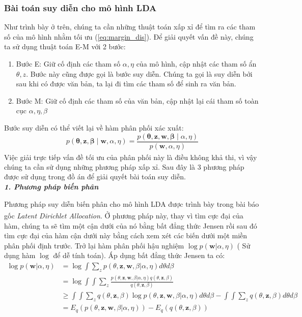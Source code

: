 \documentclass[fontsize=13pt]{scrartcl}
\begin{document}
\subsubsection{Bài toán suy diễn cho mô hình LDA}\label{sub:infermethods}
Như trình bày ở trên, chúng ta cần những thuật toán xấp xỉ để tìm ra các tham số của mô hình nhằm tối ưu (\ref{eq:margin_dis}). Để giải quyết vấn đề này, chúng ta sử dụng thuật toán E-M với 2 bước:
\begin{enumerate}
\item Bước E: Giữ cố định các tham số $\alpha,\eta$ của mô hình, cập nhật các tham số ẩn $\theta,z$. Bước này cũng được gọi là bước suy diễn. Chúng ta gọi là suy diễn bởi sau khi có được văn bản, ta lại đi tìm các tham số để sinh ra văn bản.
\item Bước M: Giữ cố định các tham số của văn bản, cập nhật lại cái tham số toàn cục $\alpha,\eta,\beta$
\end{enumerate}
Bước suy diễn có thể viết lại về hàm phân phối xác xuất:
\begin{equation}
p(\boldsymbol\theta,\mathbf{z},\boldsymbol\beta \mid \mathbf{w},\alpha,\eta) = \frac{p(\boldsymbol\theta,\mathbf{z},\mathbf{w},\boldsymbol\beta \mid \alpha,\eta)}{p(\mathbf{w},\alpha,\eta)}
\end{equation}
Việc giải trực tiếp vấn đề tối ưu của phân phối này là điều không khả thi\textsuperscript{\cite{intract}}, vì vậy chúng ta cần sử dụng những phương pháp xấp xỉ. Sau đây là 3 phương pháp được sử dụng trong đồ án để giải quyết bài toán suy diễn.\\ 
\textbf{\textit{1. Phương pháp biến phân }}
\par 
Phương pháp suy diễn biến phân cho mô hình LDA được trình bày trong bài báo gốc \textit{Latent Dirichlet Allocation}\textsuperscript{\cite{blei2003latent}}.
Ở phương pháp này, thay vì tìm cực đại của hàm, chúng ta sẽ tìm một cận dưới của nó bằng bất đẳng thức Jensen rồi sau đó tìm cực đại của hàm cận dưới này bằng cách xem xét các biến dưới một miền phân phối định trước.
Trở lại hàm phân phối hậu nghiệm $\log p(\mathbf{w}|\alpha,\eta)$ ( Sử dụng hàm $\log$ để dễ tính toán). Áp dụng bất đẳng thức Jensen ta có:
\begin{align}
\log p(\mathbf{w} | \alpha, \eta) &= \log \int \sum_{z} p(\theta,\mathbf{z},\mathbf{w},\beta | \alpha,\eta)d\theta d\beta \\
&= \log \int \int \sum_{z} \frac{p(\theta,\mathbf{z},\mathbf{w},\beta | \alpha,\eta)q(\theta,\mathbf{z},\beta)}{q(\theta,\mathbf{z},\beta)} \\
&\geq \int\int\sum_{z}q(\theta,\mathbf{z},\beta)\log p(\theta,\mathbf{z},\mathbf{w},\beta | \alpha,\eta) d\theta d\beta - \int\int\sum_{z}q(\theta,\mathbf{z},\beta) d\theta d\beta\\
&=E_q (p(\theta,\mathbf{z},\mathbf{w},\beta | \alpha,\eta)) - E_q(q(\theta,\mathbf{z},\beta)) \label{eq:varialeft}
\end{align}
\end{document}
